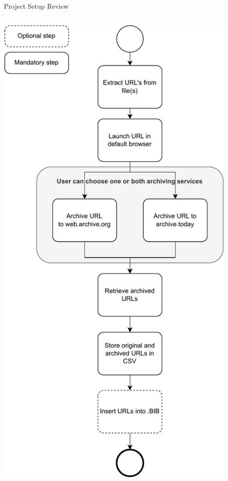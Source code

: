 \documentclass[
    ngerman,%
    authorontitle=true,
]{bfhbeamer}
\begin{document}
\begin{frame}{Project Setup Review}
\begin{columns}
\begin{column}{0.23\textwidth}
\begin{center}
	    			\includegraphics[width=0.9\textwidth]{figures/process_model-simple-vertikal}
	    		\end{center}
    		\end{column}
    	\end{columns}
    \end{frame}
\end{document}
